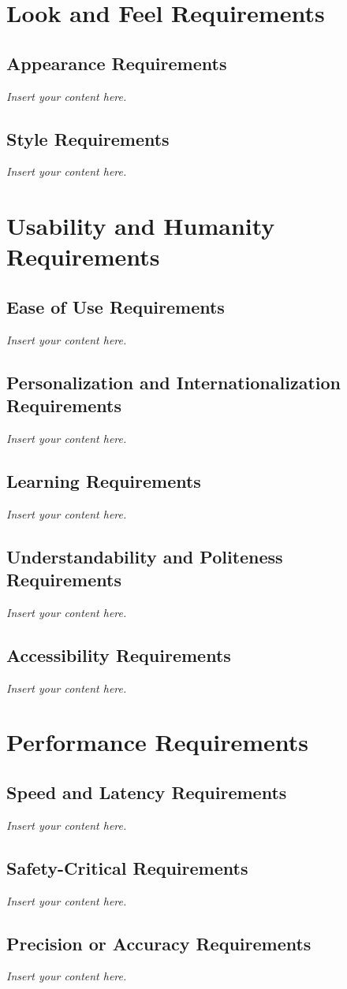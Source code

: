 \documentclass[12pt]{article}
\newcommand{\lips}{\textit{Insert your content here.}}
\begin{document}
\section{Look and Feel Requirements}
\subsection{Appearance Requirements}
\lips
\subsection{Style Requirements}
\lips

\section{Usability and Humanity Requirements}
\subsection{Ease of Use Requirements}
\lips
\subsection{Personalization and Internationalization Requirements}
\lips
\subsection{Learning Requirements}
\lips
\subsection{Understandability and Politeness Requirements}
\lips
\subsection{Accessibility Requirements}
\lips

\section{Performance Requirements}
\subsection{Speed and Latency Requirements}
\lips
\subsection{Safety-Critical Requirements}
\lips
\subsection{Precision or Accuracy Requirements}
\lips
\end{document}
